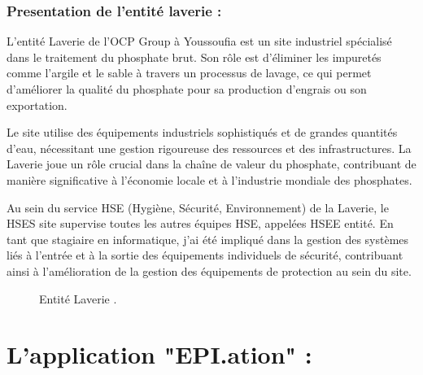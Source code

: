\documentclass[a4paper,12pt]{report}
\begin{document}
\subsection{Presentation de l'entité laverie :}
L'entité Laverie de l'OCP Group à Youssoufia est un site industriel spécialisé dans le traitement du phosphate brut. Son rôle est d'éliminer les impuretés comme l'argile et le sable à travers un processus de lavage, ce qui permet d'améliorer la qualité du phosphate pour sa production d’engrais ou son exportation.

Le site utilise des équipements industriels sophistiqués et de grandes quantités d'eau, nécessitant une gestion rigoureuse des ressources et des infrastructures. La Laverie joue un rôle crucial dans la chaîne de valeur du phosphate, contribuant de manière significative à l'économie locale et à l'industrie mondiale des phosphates.

Au sein du service HSE (Hygiène, Sécurité, Environnement) de la Laverie, le HSES site supervise toutes les autres équipes HSE, appelées HSEE entité. En tant que stagiaire en informatique, j'ai été impliqué dans la gestion des systèmes liés à l'entrée et à la sortie des équipements individuels de sécurité, contribuant ainsi à l'amélioration de la gestion des équipements de protection au sein du site.
\begin{figure}[h]
    \centering
    \caption{Entité Laverie .}
    \label{fig:mon_image}
\end{figure}





\chapter*{L'application "EPI.ation" :}
\end{document}

